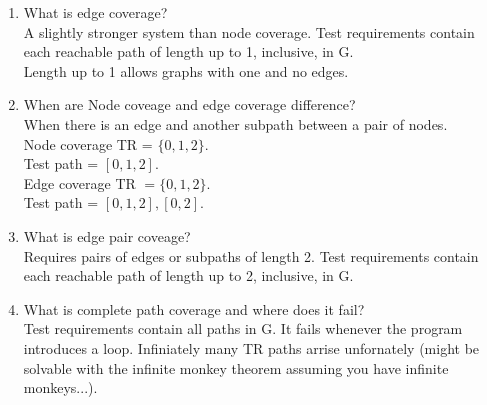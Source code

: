 \documentclass[10pt]{article}
\begin{document}
\begin{enumerate}
      \item What is edge coverage?\\
            A slightly stronger system than node coverage. Test requirements contain each reachable path of length up to 1, inclusive, in G.\\
            Length up to 1 allows graphs with one and no edges.\\

      \item When are Node coveage and edge coverage difference?\\
            When there is an edge and another subpath between a pair of nodes.\\
            Node coverage TR = $\{0 ,1 ,2\}$.\\
            Test path = $[0 , 1, 2]$.\\
            Edge coverage TR $= \{0, 1, 2\}$.\\
            Test path = $[0, 1, 2], [0, 2]$.\\

      \item What is edge pair coveage?\\
            Requires pairs of edges or subpaths of length 2. Test requirements contain each reachable path of length up to 2, inclusive, in G.\\

      \item What is complete path coverage and where does it fail?\\
            Test requirements contain all paths in G. It fails whenever the program introduces a loop. Infiniately many TR paths arrise unfornately (might be solvable with the infinite monkey theorem assuming you have infinite monkeys...).\\


\end{enumerate}
\end{document}
